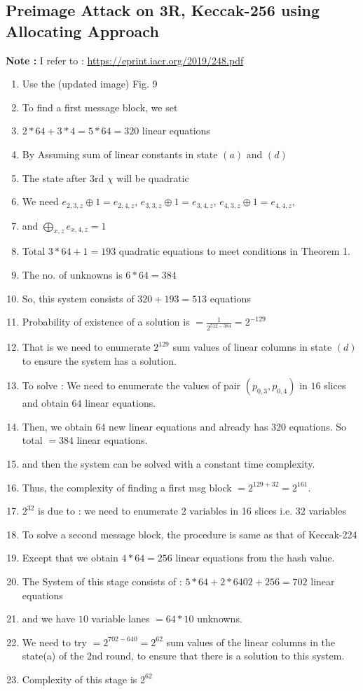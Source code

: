 \documentclass{article}
\begin{document}
\subsection{Preimage Attack on 3R, Keccak-256 using Allocating Approach}
\textbf{Note :} I refer to : \url{https://eprint.iacr.org/2019/248.pdf}
\begin{enumerate}
    \item Use the (updated image) Fig. 9 
    \item To find a first message block, we set
    \item $2*64 + 3*4 = 5*64 = 320$ linear equations
    \item By Assuming sum of linear constants in state $(a)$ and $(d)$
    \item The state after 3rd $\chi$ will be quadratic
    \item We need $e_{2,3,z} \oplus 1 = e_{2,4,z}$, $e_{3,3,z} \oplus 1 = e_{3,4,z}$, $e_{4,3,z} \oplus 1 = e_{4,4,z}$, 
    \item and $\bigoplus_{x,z} e_{x,4,z} = 1$
    \item Total $3*64 + 1 = 193$ quadratic equations to meet conditions in Theorem 1.
    \item The no. of unknowns is $6*64 = 384$
    \item So, this system consists of $320 + 193 = 513$ equations
    \item Probability of existence of a solution is $ = \frac{1}{2^{512 - 384}} = 2^{-129}$
    \item That is we need to enumerate $2^{129}$ sum values of linear columns in state $(d)$ to ensure the system has a solution.
    \item To solve : We need to enumerate the values of pair $(p_{0,3}, p_{0,4})$ in $16$ slices and obtain $64$ linear equations.
    \item Then, we obtain $64$ new linear equations and already has $320$ equations. So total $= 384$ linear equations.
    \item and then the system can be solved with a constant time complexity.
    \item Thus, the complexity of finding a first msg block $ = 2^{129 + 32} = 2^{161}$.
    \item $2^{32}$ is due to : we need to enumerate 2 variables in 16 slices i.e. 32 variables
    \item To solve a second message block, the procedure is same as that of Keccak-224
    \item Except that we obtain $4*64 = 256$ linear equations from the hash value.
    \item The System of this stage consists of : $5*64 + 2*64 0 2 + 256 = 702$ linear equations
    \item and we have $10$ variable lanes $ = 64*10 $ unknowns.
    \item We need to try $= 2^{702 - 640} = 2^{62}$ sum values of the linear columns in the state(a) of the 2nd round, to ensure that there is a solution to this system.
    \item Complexity of this stage is $2^{62}$
\end{enumerate}
\end{document}
